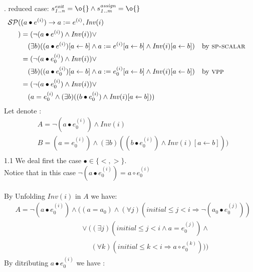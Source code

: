 \documentclass[a4paper,10pt]{article}
\newcommand{\idx}{\ensuremath{i}\xspace}
\newcommand{\idxinitial}{\ensuremath{\mathit{initial}}\xspace}
\newcommand{\at}[1]{{(#1)}}
\newcommand{\impl}{\ensuremath{\Longrightarrow}}
\newcommand{\Inv}[1]{\ensuremath{\mathit{Inv}(#1)\xspace}}
\newcommand{\gstatement}[2]{\ensuremath{s^{\mathit{#1}}_{\mathit{#2}}\xspace}}
\newcommand{\vpp}{\textsc{vpp}\xspace}
\newcommand{\spscalar}{\textsc{sp-scalar}\xspace}
\newenvironment{proof}[1][Proof.]{\begin{trivlist}
\item[\hskip \labelsep {\bfseries #1}]}{\end{trivlist}}
\begin{document}
\begin{proof}
. reduced case: $\gstatement{exit}{1..n} = \o{} \land \gstatement{assign}{1..m} = \o{}$
  \begin{align*}
    \spost{
    & (a \bullet e^\at{\idx}) \rightarrow a := e^\at{\idx}}{\Inv{\idx}\\
    }
    &= (\neg (a \bullet e^\at{\idx}) \land \Inv{\idx}) \lor \\
       & \quad (\exists b) ((a \bullet e^\at{\idx})[a\leftarrow b] \land 
       a := e^\at{\idx}[a\leftarrow b] \land \Inv{\idx}[a\leftarrow b])   && \text{by \spscalar}\\
    &= (\neg (a \bullet e_0^\at{\idx}) \land \Inv{\idx}) \lor \\
       & \quad (\exists b) ((a \bullet e_0^\at{\idx})[a\leftarrow b] \land 
       a := e_0^\at{\idx}[a\leftarrow b] \land \Inv{\idx}[a\leftarrow b])  && \text{by \vpp}\\
    &= (\neg (a \bullet e_0^\at{\idx}) \land \Inv{\idx}) \lor \\
       & \quad (a = e_0^\at{\idx} \land (\exists b) ((b \bullet e_0^\at{\idx}) 
       \land \Inv{\idx}[a\leftarrow b]))  &&\\
  \end{align*}
  Let denote :
  \begin{align*}
    &A= \neg (a \bullet e_0^\at{\idx}) \land \Inv{\idx} \\
    &B= (a = e_0^\at{\idx}) \land (\exists b) ((b \bullet e_0^\at{\idx}) \land \Inv{\idx}[a\leftarrow b])) \\
  \end{align*}
  1.1 We deal first the case $\bullet \in \{<, >\}$.\\
  Notice that in this case $\neg (a \bullet e_0^\at{\idx}) = a \circ e_0^\at{\idx}$\\
  \\
  By Unfolding $\Inv{\idx}$ in $A$ we have:
  \begin{align*}
    &A= \neg (a \bullet e_0^\at{\idx}) \land ((a = a_0) \land (\forall j)(\idxinitial \leq j < \idx \impl \neg (a_0 \bullet e_0^\at{j})) \\
    &\phantom{A= \neg (a \bullet e_0^\at{\idx}) \land (}
       \lor ((\exists j)(\idxinitial \leq j < \idx \land a = e_0^\at{j}) \land\\
    &\phantom{A= \neg (a \bullet e_0^\at{\idx}) \land  (( \lor (}
       (\forall k)(\idxinitial \leq k < \idx \impl a \circ e_0^\at{k})))
  \end{align*}
  By ditributing $a \bullet e_0^\at{\idx}$ we have :

\end{proof}
\end{document}
